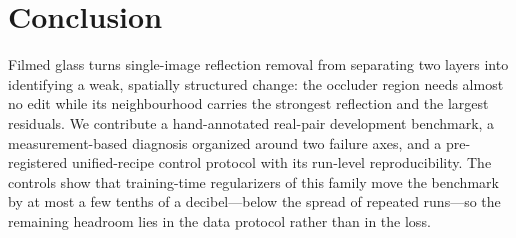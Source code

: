 \section{Conclusion}
\label{sec:conclusion}
Filmed glass turns single-image reflection removal from separating two layers
into identifying a weak, spatially structured change: the occluder region needs
almost no edit while its neighbourhood carries the strongest reflection and the
largest residuals. We contribute a hand-annotated real-pair development
benchmark, a measurement-based diagnosis organized around two failure axes, and
a pre-registered unified-recipe control protocol with its run-level
reproducibility. The controls show that training-time regularizers of this
family move the benchmark by at most a few tenths of a decibel---below the
spread of repeated runs---so the remaining headroom lies in the data protocol
rather than in the loss.
